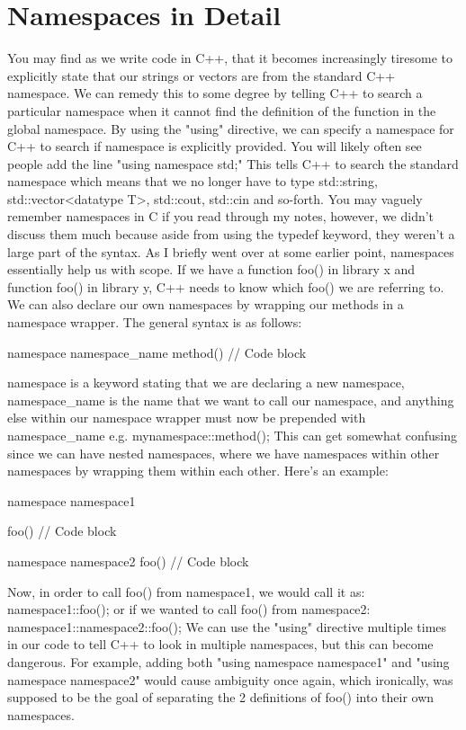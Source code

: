 \documentclass{article}
\begin{document}
\section{Namespaces in Detail}

You may find as we write code in C++, that it becomes increasingly tiresome to explicitly state that our
strings or vectors are from the standard C++ namespace. We can remedy this to some degree by telling C++ to
search a particular namespace when it cannot find the definition of the function in the global namespace. By
using the "using" directive, we can specify a namespace for C++ to search if namespace is explicitly provided.
You will likely often see people add the line "using namespace std;" This tells C++ to search the standard
namespace which means that we no longer have to type std::string, std::vector<datatype T>, std::cout, std::cin
and so-forth. You may vaguely remember namespaces in C if you read through my notes, however, we didn't discuss
them much because aside from using the typedef keyword, they weren't a large part of the syntax. As I briefly
went over at some earlier point, namespaces essentially help us with scope. If we have a function foo() in
library x and function foo() in library y, C++ needs to know which foo() we are referring to. We can also
declare our own namespaces by wrapping our methods in a namespace wrapper. The general syntax is as follows:

\begin{cpplst}
namespace namespace_name {
	method() {
		// Code block
    }
}
\end{cpplst}

namespace is a keyword stating that we are declaring a new namespace, namespace\_name is the name that we want
to call our namespace, and anything else within our namespace wrapper must now be prepended with
namespace\_name e.g. mynamespace::method(); This can get somewhat confusing since we can have nested
namespaces, where we have namespaces within other namespaces by wrapping them within each other. Here's an
example:

\begin{cpplst}
namespace namespace1 {
	foo() {
		// Code block
    }

	namespace namespace2 {
		foo() {
            // Code block
        }
    }
}
\end{cpplst}

Now, in order to call foo() from namespace1, we would call it as: namespace1::foo(); or if we wanted to call
foo() from namespace2: namespace1::namespace2::foo(); We can use the "using" directive multiple times in our
code to tell C++ to look in multiple namespaces, but this can become dangerous. For example, adding both
"using namespace namespace1" and "using namespace namespace2" would cause ambiguity once again, which
ironically, was supposed to be the goal of separating the 2 definitions of foo() into their own namespaces.
\end{document}
